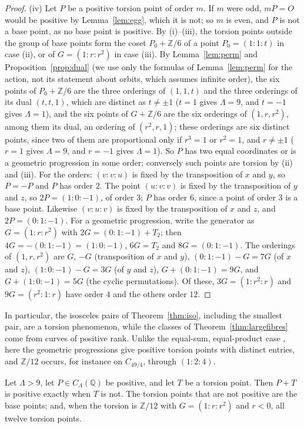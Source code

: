 \documentclass[10pt]{article}
\newcommand{\Q}{\mathbb{Q}}
\newcommand{\Z}{\mathbb{Z}}
\begin{document}
\begin{proof}
(iv) Let $P$ be a positive torsion point of order $m$. If $m$ were odd, $mP=O$ would be positive by Lemma~\ref{lem:egg}, which it is not; so $m$ is even, and $P$ is not a base point, as no base point is positive. By (i)--(iii), the torsion points outside the group of base points form the coset $P_0+\Z/6$ of a point $P_0=(1:1:t)$ in case (ii), or of $G=(1:r:r^2)$ in case (iii). By Lemma~\ref{lem:perm} and Proposition~\ref{prop:dual} (we use only the formulas of Lemma~\ref{lem:perm} for the action, not its statement about orbits, which assumes infinite order), the six points of $P_0+\Z/6$ are the three orderings of $(1,1,t)$ and the three orderings of its dual $(t,t,1)$, which are distinct as $t\ne\pm1$ ($t=1$ gives $\Lambda=9$, and $t=-1$ gives $\Lambda=1$), and the six points of $G+\Z/6$ are the six orderings of $(1,r,r^2)$, among them its dual, an ordering of $(r^2,r,1)$; these orderings are six distinct points, since two of them are proportional only if $r^3=1$ or $r^2=1$, and $r\ne\pm1$ ($r=1$ gives $\Lambda=9$, and $r=-1$ gives $\Lambda=1$). So $P$ has two equal coordinates or is a geometric progression in some order; conversely such points are torsion by (ii) and (iii). For the orders: $(v:v:u)$ is fixed by the transposition of $x$ and $y$, so $P=-P$ and $P$ has order $2$. The point $(u:v:v)$ is fixed by the transposition of $y$ and $z$, so $2P=(1:0:-1)$, of order $3$; $P$ has order $6$, since a point of order $3$ is a base point. Likewise $(v:u:v)$ is fixed by the transposition of $x$ and $z$, and $2P=(0:1:-1)$. For a geometric progression, write the generator as $G=(1:r:r^2)$ with $2G=(0:1:-1)+T_2$; then $4G=-(0:1:-1)=(1:0:-1)$, $6G=T_2$ and $8G=(0:1:-1)$. The orderings of $(1,r,r^2)$ are $G$, $-G$ (transposition of $x$ and $y$), $(0:1:-1)-G=7G$ (of $x$ and $z$), $(1:0:-1)-G=3G$ (of $y$ and $z$), $G+(0:1:-1)=9G$, and $G+(1:0:-1)=5G$ (the cyclic permutations). Of these, $3G=(1:r^2:r)$ and $9G=(r^2:1:r)$ have order $4$ and the others order $12$.
\end{proof}

In particular, the isosceles pairs of Theorem~\ref{thm:iso}, including the smallest pair, are a torsion phenomenon, while the classes of Theorem~\ref{thm:largefibres} come from curves of positive rank. Unlike the equal-sum, equal-product case \cite[Proposition~2.7 and Theorem~2.8]{sadekelsissi2015}, here the geometric progressions give positive torsion points with distinct entries, and $\Z/12$ occurs, for instance on $C_{49/4}$, through $(1:2:4)$.

\begin{lemma}\label{lem:postrans}
Let $\Lambda>9$, let $P\in C_\Lambda(\Q)$ be positive, and let $T$ be a torsion point. Then $P+T$ is positive exactly when $T$ is not. The torsion points that are not positive are the base points; and, when the torsion is $\Z/12$ with $G=(1:r:r^2)$ and $r<0$, all twelve torsion points.
\end{lemma}
\end{document}
